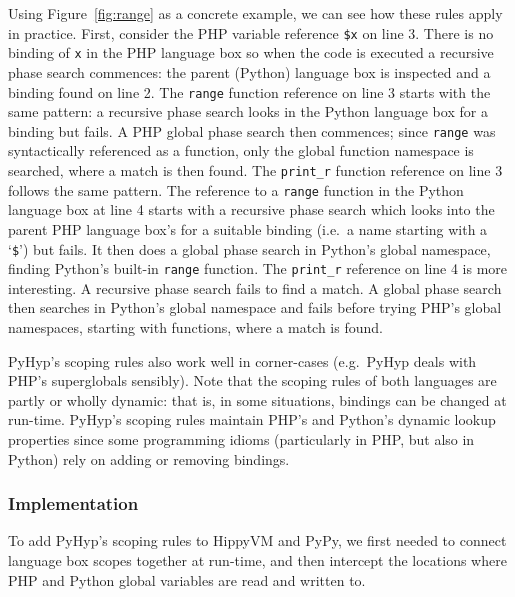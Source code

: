\documentclass[a4paper,UKenglish]{lipics-v2016}
\newcommand{\ourvm}{PyHyp\xspace}
\newcommand{\hippy}{HippyVM\xspace}
\newcommand{\pypy}{PyPy\xspace}
\begin{document}
Using Figure~\ref{fig:range} as a concrete example, we can see how these rules
apply in practice. First, consider the PHP variable reference \texttt{\$x} on
line 3. There is no binding of \texttt{x} in the PHP language box so when the
code is executed a recursive phase search commences: the
parent (Python) language box is inspected and a binding found on line 2.
The \texttt{range} function reference on
line 3 starts with the same pattern: a recursive phase search looks in the Python
language box for a binding but fails. A PHP global phase search then commences; since \texttt{range} was
syntactically referenced as a function, only the global function namespace is
searched, where a match is then found. The
\texttt{print\_r} function reference on line 3 follows the same pattern. The reference to a
\texttt{range} function in the Python language box at line 4 starts with a recursive
phase search which looks into the parent PHP language box's for a suitable
binding (i.e.~a name starting with a `\texttt{\$}') but fails. It then does a global
phase search in Python's global namespace, finding Python's built-in \texttt{range}
function. The \texttt{print\_r} reference on line 4 is more interesting. A
recursive phase search fails to find a match. A global phase search then searches in
Python's global namespace and fails before trying PHP's global namespaces,
starting with functions, where a match is found.

\ourvm's scoping rules also work well in corner-cases (e.g.~\ourvm deals
with PHP's superglobals sensibly). Note that the scoping rules of both languages
are partly or wholly
dynamic: that is, in some situations, bindings can be changed at run-time.
\ourvm's scoping rules maintain PHP's and Python's dynamic lookup properties
since some programming idioms (particularly in PHP, but also
in Python) rely on adding or removing bindings.


\subsubsection{Implementation}
\label{sec:implementing scopes}

To add \ourvm's scoping rules to \hippy and \pypy, we first needed to
connect language box scopes together at run-time, and then intercept the
locations where PHP and Python global variables are read and written to.
\end{document}
